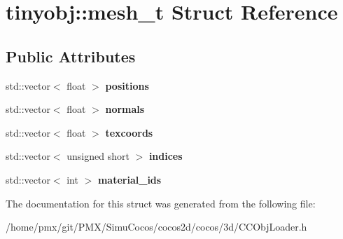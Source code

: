 \hypertarget{structtinyobj_1_1mesh__t}{}\section{tinyobj\+:\+:mesh\+\_\+t Struct Reference}
\label{structtinyobj_1_1mesh__t}
\subsection*{Public Attributes}
\begin{DoxyCompactItemize}
\item 
\mbox{\label{structtinyobj_1_1mesh__t_aabaed444cf88c5f0f6f1085651400bbc}} 
std\+::vector$<$ float $>$ {\bfseries positions}
\item 
\mbox{\label{structtinyobj_1_1mesh__t_a56f4181466824ed4ea325182f13b8c64}} 
std\+::vector$<$ float $>$ {\bfseries normals}
\item 
\mbox{\label{structtinyobj_1_1mesh__t_a9bac5999244db71d2a374ef1e88d8988}} 
std\+::vector$<$ float $>$ {\bfseries texcoords}
\item 
\mbox{\label{structtinyobj_1_1mesh__t_a99e6dbd9a26cfd23b9b310f0921ca13e}} 
std\+::vector$<$ unsigned short $>$ {\bfseries indices}
\item 
\mbox{\label{structtinyobj_1_1mesh__t_a366950d13450b2799dd958486eb5be8a}} 
std\+::vector$<$ int $>$ {\bfseries material\+\_\+ids}
\end{DoxyCompactItemize}


The documentation for this struct was generated from the following file\+:\begin{DoxyCompactItemize}
\item 
/home/pmx/git/\+P\+M\+X/\+Simu\+Cocos/cocos2d/cocos/3d/C\+C\+Obj\+Loader.\+h\end{DoxyCompactItemize}
